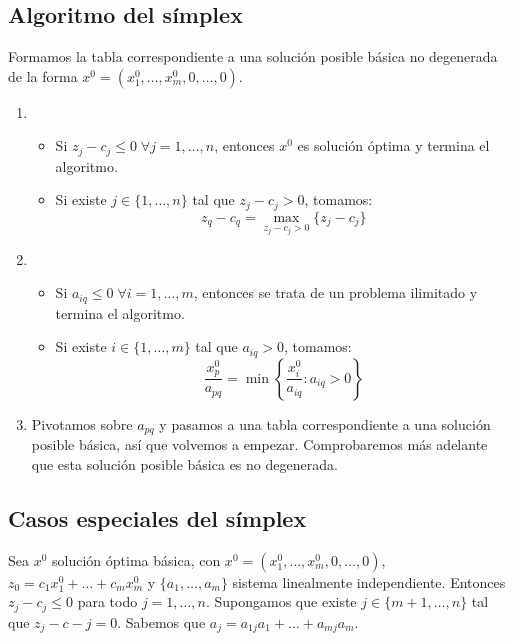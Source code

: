 \subsection*{Algoritmo del símplex}
Formamos la tabla correspondiente a una solución posible básica no degenerada de la forma $x^0 = (x^0_1, \dots, x^0_m, 0, \dots, 0)$.
\begin{enumerate}
    \item \begin{itemize}
              \item Si $z_j - c_j \leq 0 \; \forall j = 1, \dots, n$, entonces $x^0$ es solución óptima y termina el algoritmo.
              \item Si existe $j \in \{1, \dots, n\}$ tal que $z_j - c_j > 0$, tomamos:
                    $$z_q - c_q = \max_{z_j-c_j > 0}\{z_j-c_j\}$$
          \end{itemize}
    \item \begin{itemize}
              \item Si $a_{iq} \leq 0 \; \forall i = 1, \dots, m$, entonces se trata de un problema ilimitado y termina el algoritmo.
              \item Si existe $i \in \{1, \dots, m\}$ tal que $a_{iq} > 0$, tomamos:
                    $$\frac{x^0_p}{a_{pq}} = \min\left\{\frac{x^0_i}{a_{iq}} : a_{iq} > 0\right\}$$
          \end{itemize}
    \item Pivotamos sobre $a_{pq}$ y pasamos a una tabla correspondiente a una solución posible básica, así que volvemos a empezar.
          Comprobaremos más adelante que esta solución posible básica es no degenerada.
\end{enumerate}

\subsection*{Casos especiales del símplex}
Sea $x^0$ solución óptima básica, con $x^0 = (x^0_1, \dots, x^0_m, 0, \dots, 0)$, $z_0 = c_1x^0_1 + \dots + c_mx^0_m$ y $\{a_1, \dots, a_m\}$ sistema linealmente independiente.
Entonces $z_j - c_j \leq 0$ para todo $j = 1, \dots, n$.
Supongamos que existe $j \in \{m+1, \dots, n\}$ tal que $z_j-c-j = 0$.
Sabemos que $a_j = a_{1j}a_1 + \dots + a_{mj}a_m$.

